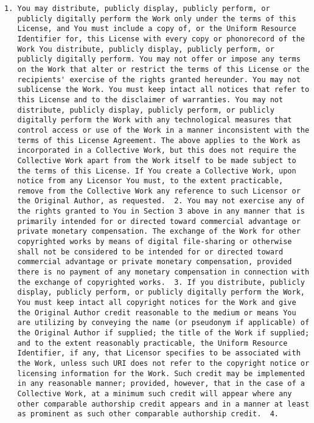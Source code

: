 \begin{lstlisting}[firstnumber=1,]
   1. You may distribute, publicly display, publicly perform, or
   publicly digitally perform the Work only under the terms of this
   License, and You must include a copy of, or the Uniform Resource
   Identifier for, this License with every copy or phonorecord of the
   Work You distribute, publicly display, publicly perform, or
   publicly digitally perform. You may not offer or impose any terms
   on the Work that alter or restrict the terms of this License or the
   recipients' exercise of the rights granted hereunder. You may not
   sublicense the Work. You must keep intact all notices that refer to
   this License and to the disclaimer of warranties. You may not
   distribute, publicly display, publicly perform, or publicly
   digitally perform the Work with any technological measures that
   control access or use of the Work in a manner inconsistent with the
   terms of this License Agreement. The above applies to the Work as
   incorporated in a Collective Work, but this does not require the
   Collective Work apart from the Work itself to be made subject to
   the terms of this License. If You create a Collective Work, upon
   notice from any Licensor You must, to the extent practicable,
   remove from the Collective Work any reference to such Licensor or
   the Original Author, as requested.  2. You may not exercise any of
   the rights granted to You in Section 3 above in any manner that is
   primarily intended for or directed toward commercial advantage or
   private monetary compensation. The exchange of the Work for other
   copyrighted works by means of digital file-sharing or otherwise
   shall not be considered to be intended for or directed toward
   commercial advantage or private monetary compensation, provided
   there is no payment of any monetary compensation in connection with
   the exchange of copyrighted works.  3. If you distribute, publicly
   display, publicly perform, or publicly digitally perform the Work,
   You must keep intact all copyright notices for the Work and give
   the Original Author credit reasonable to the medium or means You
   are utilizing by conveying the name (or pseudonym if applicable) of
   the Original Author if supplied; the title of the Work if supplied;
   and to the extent reasonably practicable, the Uniform Resource
   Identifier, if any, that Licensor specifies to be associated with
   the Work, unless such URI does not refer to the copyright notice or
   licensing information for the Work. Such credit may be implemented
   in any reasonable manner; provided, however, that in the case of a
   Collective Work, at a minimum such credit will appear where any
   other comparable authorship credit appears and in a manner at least
   as prominent as such other comparable authorship credit.  4.


\end{lstlisting}
